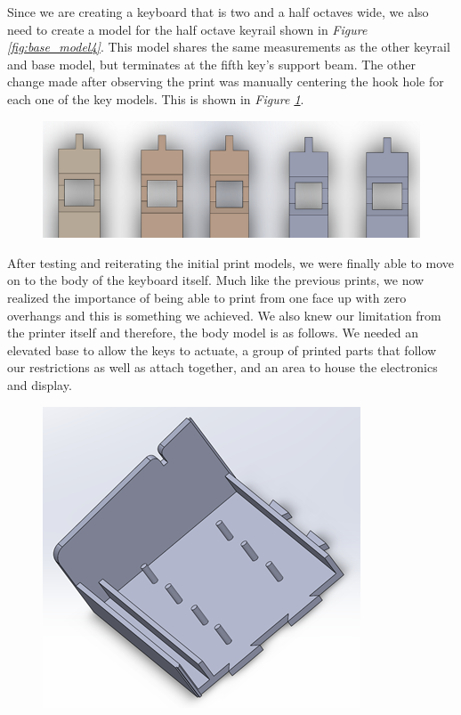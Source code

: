 Since we are creating a keyboard that is two and a half octaves wide, we also need to create a model for the half octave keyrail shown in \textit{Figure \ref{fig:base_model4}}. This model shares the same measurements as the other keyrail and base model, but terminates at the fifth key’s support beam.
The other change made after observing the print was manually centering the hook hole for each one of the key models. This is shown in \textit{Figure \ref{fig:key_models}}.

\begin{figure}[h!]
  \centering
  \includegraphics[width=0.8\linewidth]{image/KeyModels.png}
  \caption{}
  \label{fig:key_models}
\end{figure}

After testing and reiterating the initial print models, we were finally able to move on to the body of the keyboard itself. Much like the previous prints, we now realized the importance of being able to print from one face up with zero overhangs and this is something we achieved. We also knew our limitation from the printer itself and therefore, the body model is as follows. We needed an elevated base to allow the keys to actuate, a group of printed parts that follow our restrictions as well as attach together, and an area to house the electronics and display.

\begin{figure}[h!]
  \centering
  \includegraphics[width=0.8\linewidth]{image/BodyModel1.png}
  \caption{}
  \label{fig:body_model1}
\end{figure}

